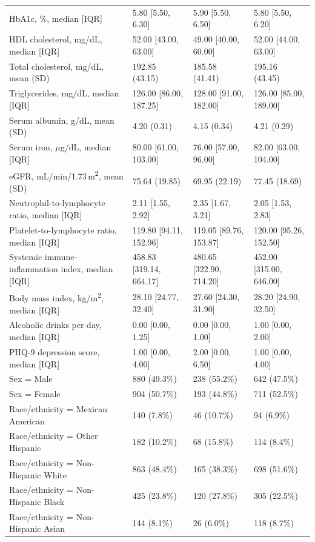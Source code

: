 \documentclass[12pt]{article}
\begin{document}
\begin{singlespace}
\begin{longtable}{L{4.6cm}R{3.35cm}R{3.35cm}R{3.35cm}}
HbA1c, \%, median [IQR] & 5.80 [5.50, 6.30] & 5.90 [5.50, 6.50] & 5.80 [5.50, 6.20] \\
HDL cholesterol, mg/dL, median [IQR] & 52.00 [43.00, 63.00] & 49.00 [40.00, 60.00] & 52.00 [44.00, 63.00] \\
Total cholesterol, mg/dL, mean (SD) & 192.85 (43.15) & 185.58 (41.41) & 195.16 (43.45) \\
Triglycerides, mg/dL, median [IQR] & 126.00 [86.00, 187.25] & 128.00 [91.00, 182.00] & 126.00 [85.00, 189.00] \\
Serum albumin, g/dL, mean (SD) & 4.20 (0.31) & 4.15 (0.34) & 4.21 (0.29) \\
Serum iron, $\mu$g/dL, median [IQR] & 80.00 [61.00, 103.00] & 76.00 [57.00, 96.00] & 82.00 [63.00, 104.00] \\
eGFR, mL/min/1.73\,m\textsuperscript{2}, mean (SD) & 75.64 (19.85) & 69.95 (22.19) & 77.45 (18.69) \\
Neutrophil-to-lymphocyte ratio, median [IQR] & 2.11 [1.55, 2.92] & 2.35 [1.67, 3.21] & 2.05 [1.53, 2.83] \\
Platelet-to-lymphocyte ratio, median [IQR] & 119.80 [94.11, 152.96] & 119.05 [89.76, 153.87] & 120.00 [95.26, 152.50] \\
Systemic immune-inflammation index, median [IQR] & 458.83 [319.14, 664.17] & 480.65 [322.90, 714.20] & 452.00 [315.00, 646.00] \\
Body mass index, kg/m\textsuperscript{2}, median [IQR] & 28.10 [24.77, 32.40] & 27.60 [24.30, 31.90] & 28.20 [24.90, 32.50] \\
Alcoholic drinks per day, median [IQR] & 0.00 [0.00, 1.25] & 0.00 [0.00, 1.00] & 1.00 [0.00, 2.00] \\
PHQ-9 depression score, median [IQR] & 1.00 [0.00, 4.00] & 2.00 [0.00, 6.50] & 1.00 [0.00, 4.00] \\
Sex = Male & 880 (49.3\%) & 238 (55.2\%) & 642 (47.5\%) \\
Sex = Female & 904 (50.7\%) & 193 (44.8\%) & 711 (52.5\%) \\
Race/ethnicity = Mexican American & 140 (7.8\%) & 46 (10.7\%) & 94 (6.9\%) \\
Race/ethnicity = Other Hispanic & 182 (10.2\%) & 68 (15.8\%) & 114 (8.4\%) \\
Race/ethnicity = Non-Hispanic White & 863 (48.4\%) & 165 (38.3\%) & 698 (51.6\%) \\
Race/ethnicity = Non-Hispanic Black & 425 (23.8\%) & 120 (27.8\%) & 305 (22.5\%) \\
Race/ethnicity = Non-Hispanic Asian & 144 (8.1\%) & 26 (6.0\%) & 118 (8.7\%) \\

\end{longtable}
\end{singlespace}
\end{document}
